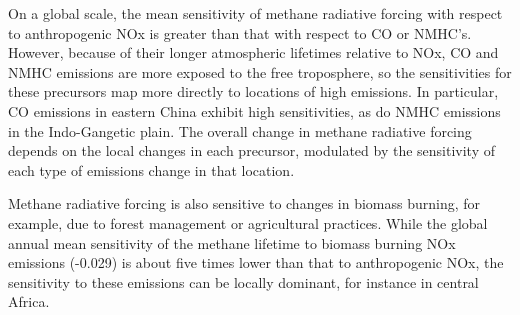 
On a global scale, the mean sensitivity of methane radiative forcing with respect to anthropogenic NOx is greater than that with respect to CO or NMHC's. However, because of their longer atmospheric lifetimes relative to NOx, CO and NMHC emissions are more exposed to the free troposphere, so the sensitivities for these precursors map more directly to locations of high emissions. In particular, CO emissions in eastern China exhibit high sensitivities, as do NMHC emissions in the Indo-Gangetic plain. The overall change in methane radiative forcing depends on the local changes in each precursor, modulated by the sensitivity of each type of emissions change in that location.


Methane radiative forcing is also sensitive to changes in biomass burning, for example, due to forest management or agricultural practices. While the global annual mean sensitivity of the methane lifetime to biomass burning NOx emissions (-0.029) is about five times lower than that to anthropogenic NOx, the sensitivity to these emissions can be locally dominant, for instance in central Africa.
